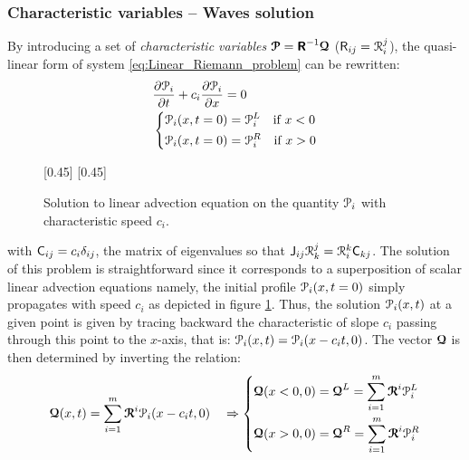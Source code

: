 \subsubsection*{Characteristic variables -- Waves solution}
By introducing a set of \textit{characteristic variables} ${\boldsymbol{\mathcal{P}}}=\boldsymbol{\mathsf{R}}^{-1}{\boldsymbol{\mathcal{Q}}}$ ($\mathsf{R}_{ij}=\mathcal{R}^j_i$), the quasi-linear form of system \eqref{eq:Linear_Riemann_problem} can be rewritten:
\begin{equation*}
  \begin{aligned}
    &\frac{\partial \mathcal{P}_i}{\partial t} + c_i\frac{\partial \mathcal{P}_i}{\partial x} = 0 \\
    &\left\lbrace 
      \begin{aligned}
        & \mathcal{P}_i(x,t=0) = \mathcal{P}_i^L \quad \text{if } x< 0\\
        & \mathcal{P}_i(x,t=0) = \mathcal{P}_i^R \quad \text{if } x> 0
      \end{aligned}
    \right.
  \end{aligned}
\end{equation*}
\begin{figure}[h]
  \centering
  \subcaptionbox*{}[0.45\linewidth]{}
  \subcaptionbox*{}[0.45\linewidth]{}
  \caption{Solution to linear advection equation on the quantity $\mathcal{P}_i$ with characteristic speed $c_i$.}
  \label{fig:advection}
\end{figure}
with $\mathsf{C}_{ij}=c_i\delta_{ij}$, the matrix of eigenvalues so that $\mathsf{J}_{ij} \mathcal{R}^j_k = \mathcal{R}^k_i\mathsf{C}_{kj}$. The solution of this problem is straightforward since it corresponds to a superposition of scalar linear advection equations namely, the initial profile $\mathcal{P}_i(x,t=0)$ simply propagates with speed $c_i$ as depicted in figure \ref{fig:advection}. Thus, the solution  $\mathcal{P}_i(x,t)$ at a given point is given by tracing backward the characteristic of slope $c_i$ passing through this point to the $x$-axis, that is: $\mathcal{P}_i(x,t)=\mathcal{P}_i(x-c_it,0)$. 
The vector ${\boldsymbol{\mathcal{Q}}}$ is then determined by inverting the relation:
\begin{equation}
  \label{eq:Q_expansion}
  {\boldsymbol{\mathcal{Q}}}(x,t) = \sum_{i=1}^m {\boldsymbol{\mathcal{R}}}^i \mathcal{P}_i(x-c_it,0) \quad \Rightarrow
  \left\lbrace
    \begin{aligned}
      & {\boldsymbol{\mathcal{Q}}}(x<0,0)={\boldsymbol{\mathcal{Q}}}^L=\sum_{i=1}^{m}{\boldsymbol{\mathcal{R}}}^i \mathcal{P}_i^L\\
      & {\boldsymbol{\mathcal{Q}}}(x>0,0)={\boldsymbol{\mathcal{Q}}}^R= \sum_{i=1}^{m}{\boldsymbol{\mathcal{R}}}^i \mathcal{P}_i^R
    \end{aligned}
    \right.
\end{equation}
